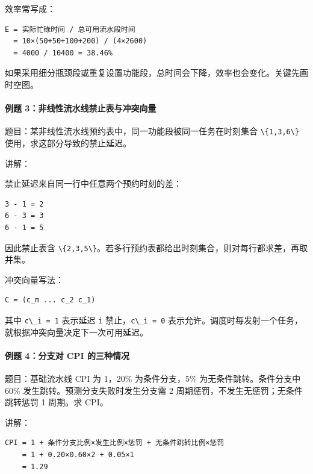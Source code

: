 \documentclass[
]{ctexart}
\newcommand{\passthrough}[1]{#1}
\begin{document}
效率常写成：

\begin{lstlisting}
E = 实际忙碌时间 / 总可用流水段时间
  = 10×(50+50+100+200) / (4×2600)
  = 4000 / 10400 = 38.46%
\end{lstlisting}

如果采用细分瓶颈段或重复设置功能段，总时间会下降，效率也会变化。关键先画时空图。

\paragraph{例题
3：非线性流水线禁止表与冲突向量}\label{ux4f8bux9898-3ux975eux7ebfux6027ux6d41ux6c34ux7ebfux7981ux6b62ux8868ux4e0eux51b2ux7a81ux5411ux91cf}

题目：某非线性流水线预约表中，同一功能段被同一任务在时刻集合
\passthrough{\lstinline!\{1,3,6\}!} 使用，求这部分导致的禁止延迟。

讲解：

禁止延迟来自同一行中任意两个预约时刻的差：

\begin{lstlisting}
3 - 1 = 2
6 - 3 = 3
6 - 1 = 5
\end{lstlisting}

因此禁止表含
\passthrough{\lstinline!\{2,3,5\}!}。若多行预约表都给出时刻集合，则对每行都求差，再取并集。

冲突向量写法：

\begin{lstlisting}
C = (c_m ... c_2 c_1)
\end{lstlisting}

其中 \passthrough{\lstinline!c\_i = 1!} 表示延迟
\passthrough{\lstinline!i!} 禁止，\passthrough{\lstinline!c\_i = 0!}
表示允许。调度时每发射一个任务，就根据冲突向量决定下一次可用延迟。

\paragraph{例题 4：分支对 CPI
的三种情况}\label{ux4f8bux9898-4ux5206ux652fux5bf9-cpi-ux7684ux4e09ux79cdux60c5ux51b5}

题目：基础流水线 CPI 为 1，20\% 为条件分支，5\% 为无条件跳转。条件分支中
60\% 发生跳转。预测分支失败时发生分支需 2
周期惩罚，不发生无惩罚；无条件跳转惩罚 1 周期。求 CPI。

讲解：

\begin{lstlisting}
CPI = 1 + 条件分支比例×发生比例×惩罚 + 无条件跳转比例×惩罚
    = 1 + 0.20×0.60×2 + 0.05×1
    = 1.29
\end{lstlisting}
\end{document}
